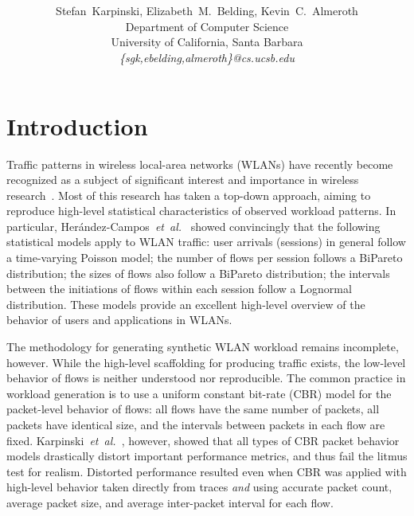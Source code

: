 \documentclass[conference]{IEEEtran}
\title{
\vspace{-0.25em}
\thetitle
}
\author{
{\large{Stefan~Karpinski, Elizabeth~M.~Belding, Kevin~C.~Almeroth}} \vspace{0.25em}\\
Department of Computer Science \\
University of California, Santa Barbara \vspace{0.35em}\\
\textit{\{sgk,ebelding,almeroth\}@cs.ucsb.edu}
}
\newcommand{\caps}[1]{{\small{#1}}}
\begin{document}
\maketitle


\section{Introduction}\label{sec:intro}

Traffic patterns in wireless local-area networks (\caps{WLAN}s) have recently become recognized as a subject of significant interest and importance in wireless research~\cite{Papadopouli05,Hernandez06:wlan-traffic,Ploumidis07,Karaliopoulos07,Karpinski07:realism,Karpinski07:cbr-failure}. Most of this research has taken a top-down approach, aiming to reproduce high-level statistical characteristics of observed workload patterns. In particular, Her\'andez-Campos~\textit{et~al.}~\cite{Hernandez06:wlan-traffic} showed convincingly that the following statistical models apply to \caps{WLAN} traffic: user arrivals (sessions) in general follow a time-varying Poisson model; the number of flows per session follows a BiPareto distribution; the sizes of flows also follow a BiPareto distribution; the intervals between the initiations of flows within each session follow a Lognormal distribution. These models provide an excellent high-level overview of the behavior of users and applications in \caps{WLAN}s.

The methodology for generating synthetic \caps{WLAN} workload remains incomplete, however. While the high-level scaffolding for producing traffic exists, the low-level behavior of flows is neither understood nor reproducible. The common practice in workload generation is to use a uniform constant bit-rate (\caps{CBR}) model for the packet-level behavior of flows: all flows have the same number of packets, all packets have identical size, and the intervals between packets in each flow are fixed. Karpinski~\textit{et~al.}~\cite{Karpinski07:realism,Karpinski07:cbr-failure}, however, showed that all types of \caps{CBR} packet behavior models drastically distort important performance metrics, and thus fail the litmus test for realism. Distorted performance resulted even when \caps{CBR} was applied with high-level behavior taken directly from traces \textit{and} using accurate packet count, average packet size, and average inter-packet interval for each flow.%
\end{document}

